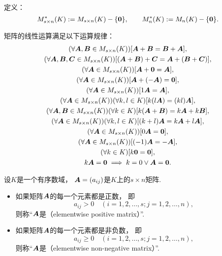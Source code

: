 定义：\begin{equation*}
	M_{s \times n}^*(K) := M_{s \times n}(K)-\{\boldsymbol0\},
	\qquad
	M_n^*(K) := M_n(K)-\{\boldsymbol0\}.
\end{equation*}

\begin{theorem}
矩阵的线性运算满足以下运算规律：
\begin{gather}
	(\forall\boldsymbol{A},\boldsymbol{B}\in M_{s\times n}(K))[\boldsymbol{A} + \boldsymbol{B} = \boldsymbol{B} + \boldsymbol{A}], \\
	(\forall\boldsymbol{A},\boldsymbol{B},\boldsymbol{C}\in M_{s\times n}(K))[(\boldsymbol{A} + \boldsymbol{B}) + \boldsymbol{C} = \boldsymbol{A} + (\boldsymbol{B} + \boldsymbol{C})], \\
	(\forall\boldsymbol{A} \in M_{s\times n}(K))[\boldsymbol{A} + \boldsymbol0 = \boldsymbol{A}], \\
	(\forall\boldsymbol{A} \in M_{s\times n}(K))[\boldsymbol{A} + (-\boldsymbol{A}) = \boldsymbol0], \\
	(\forall\boldsymbol{A} \in M_{s\times n}(K))[1 \boldsymbol{A} = \boldsymbol{A}], \\
	(\forall\boldsymbol{A} \in M_{s\times n}(K))(\forall k,l\in K)[k(l \boldsymbol{A}) = (kl) \boldsymbol{A}], \\
	(\forall\boldsymbol{A},\boldsymbol{B}\in M_{s\times n}(K))(\forall k\in K)[k(\boldsymbol{A} + \boldsymbol{B}) = k\boldsymbol{A} + k\boldsymbol{B}], \\
	(\forall\boldsymbol{A} \in M_{s\times n}(K))(\forall k,l\in K)[(k+l)\boldsymbol{A} = k\boldsymbol{A} + l\boldsymbol{A}], \\
	(\forall\boldsymbol{A} \in M_{s\times n}(K))[0\boldsymbol{A} = \boldsymbol0], \\
	(\forall\boldsymbol{A} \in M_{s\times n}(K))[(-1)\boldsymbol{A} = -\boldsymbol{A}], \\
	(\forall k\in K)[k\boldsymbol0 = \boldsymbol0], \\
	k\boldsymbol{A} = \boldsymbol0 \implies k = 0 \lor \boldsymbol{A} = \boldsymbol0.
\end{gather}
\end{theorem}

\begin{definition}
设\(K\)是一个有序数域，
\(\boldsymbol{A} = (a_{ij})\)是\(K\)上的\(s \times n\)矩阵.
\begin{itemize}
	\item 如果矩阵\(\boldsymbol{A}\)的每一个元素都是正数，
	即\begin{equation*}
		a_{ij} > 0
		\quad(i=1,2,\dotsc,s;j=1,2,\dotsc,n),
	\end{equation*}
	则称“\(\boldsymbol{A}\)是（elementwise positive matrix）”.

	\item 如果矩阵\(\boldsymbol{A}\)的每一个元素都是非负数，
	即\begin{equation*}
		a_{ij} \geq 0
		\quad(i=1,2,\dotsc,s;j=1,2,\dotsc,n),
	\end{equation*}
	则称“\(\boldsymbol{A}\)是（elementwise non-negative matrix）”.
\end{itemize}
\end{definition}

